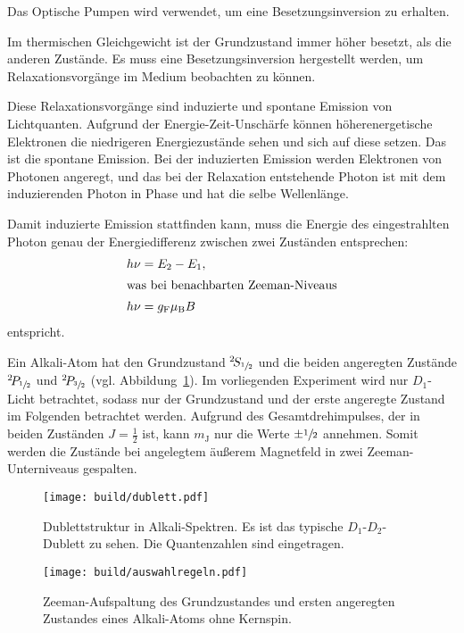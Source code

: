 Das Optische Pumpen wird verwendet, um eine Besetzungsinversion zu erhalten.

Im thermischen Gleichgewicht ist der Grundzustand immer höher besetzt, als die
anderen Zustände.
Es muss eine Besetzungsinversion hergestellt werden, um Relaxationsvorgänge im
Medium beobachten zu können.

Diese Relaxationsvorgänge sind induzierte und spontane Emission von
Lichtquanten.
Aufgrund der Energie-Zeit-Unschärfe können höherenergetische Elektronen die
niedrigeren Energiezustände sehen und sich auf diese setzen.
Das ist die spontane Emission.
Bei der induzierten Emission werden Elektronen von Photonen angeregt,
und das bei der Relaxation entstehende Photon ist mit dem induzierenden Photon
in Phase und hat die selbe Wellenlänge.

Damit induzierte Emission stattfinden kann, muss die Energie des eingestrahlten Photon
genau der Energiedifferenz zwischen zwei Zuständen entsprechen:
\begin{align}
  h \nu &= E_2 - E_1, \\
  \intertext{was bei benachbarten Zeeman-Niveaus}
  \label{eq:zeeman_energie}
  h \nu &= g_\text{F} \mu_\text{B} B
\end{align}
entspricht.

Ein Alkali-Atom hat den Grundzustand
${}^2\!S_{\sfrac{1}{2}}$
und die beiden angeregten Zustände
${}^2\!P_{\sfrac{1}{2}}$
und
${}^2\!P_{\sfrac{3}{2}}$
(vgl. Abbildung~\ref{fig:dublett}).
Im vorliegenden Experiment wird nur $D_1$-Licht betrachtet,
sodass nur der Grundzustand und der erste angeregte Zustand im Folgenden
betrachtet werden.
Aufgrund des Gesamtdrehimpulses, der in beiden Zuständen $J = \frac{1}{2}$ ist,
kann $m_\text{J}$ nur die Werte $\pm\sfrac{1}{2}$ annehmen.
Somit werden die Zustände bei angelegtem äußerem Magnetfeld in zwei
Zeeman-Unterniveaus gespalten.

\begin{figure}[ht]
  \centering
  \texttt{[image: build/dublett.pdf]}
  \caption{%
    Dublettstruktur in Alkali-Spektren.\cite{anleitung}
    Es ist das typische $D_1$-$D_2$-Dublett zu sehen.
    Die Quantenzahlen sind eingetragen.
  }%
  \label{fig:dublett}
\end{figure}

\begin{figure}[ht]
  \centering
  \texttt{[image: build/auswahlregeln.pdf]}
  \caption{%
    Zeeman-Aufspaltung des Grundzustandes und ersten angeregten
  Zustandes eines Alkali-Atoms ohne Kernspin.\cite{anleitung}
  }%
  \label{fig:auswahlregeln}
\end{figure}

